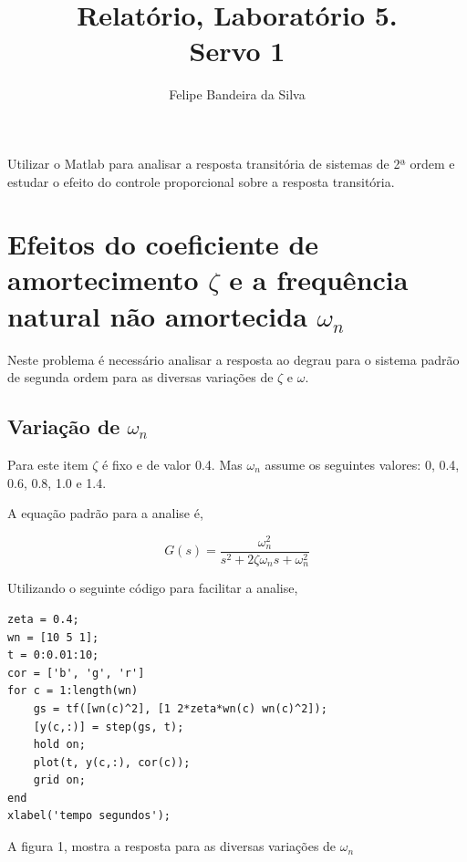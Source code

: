 \documentclass[paper=a4, fontsize=11pt]{article}
\title{Relatório, Laboratório 5.\\Servo 1}
\author{Felipe Bandeira da Silva}
\date{}
\begin{document}
\maketitle

Utilizar o Matlab para analisar a resposta transitória de sistemas de 2ª ordem e 
estudar o efeito do controle proporcional sobre a resposta transitória.

\newpage

\listoffigures

\newpage


\section{Efeitos do coeficiente de amortecimento $\zeta$ e a frequência natural
não amortecida $\omega_n$}

Neste problema é necessário analisar a resposta ao degrau para o sistema 
padrão de segunda ordem para as diversas variações de $\zeta$ e $\omega$. 

\subsection{Variação de $\omega_n$}

Para este item $\zeta$ é fixo e de valor 0.4. Mas $\omega_n$ assume os seguintes
valores: 0, 0.4, 0.6, 0.8, 1.0 e 1.4.

A equação padrão para a analise é,

\begin{equation}
    G(s) = \frac{\omega_n^2}{s^2 + 2 \zeta \omega_n s + \omega_n^2}
\end{equation}

Utilizando o seguinte código para facilitar a analise, 

\begin{lstlisting}
zeta = 0.4;
wn = [10 5 1];
t = 0:0.01:10;
cor = ['b', 'g', 'r']
for c = 1:length(wn)
    gs = tf([wn(c)^2], [1 2*zeta*wn(c) wn(c)^2]);
    [y(c,:)] = step(gs, t);
    hold on;
    plot(t, y(c,:), cor(c));
    grid on;
end
xlabel('tempo segundos');
\end{lstlisting}

A figura 1, mostra a resposta para as diversas variações de $\omega_n$
\end{document}
